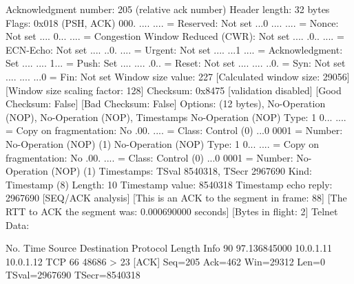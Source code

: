     Acknowledgment number: 205    (relative ack number)
    Header length: 32 bytes
    Flags: 0x018 (PSH, ACK)
        000. .... .... = Reserved: Not set
        ...0 .... .... = Nonce: Not set
        .... 0... .... = Congestion Window Reduced (CWR): Not set
        .... .0.. .... = ECN-Echo: Not set
        .... ..0. .... = Urgent: Not set
        .... ...1 .... = Acknowledgment: Set
        .... .... 1... = Push: Set
        .... .... .0.. = Reset: Not set
        .... .... ..0. = Syn: Not set
        .... .... ...0 = Fin: Not set
    Window size value: 227
    [Calculated window size: 29056]
    [Window size scaling factor: 128]
    Checksum: 0x8475 [validation disabled]
        [Good Checksum: False]
        [Bad Checksum: False]
    Options: (12 bytes), No-Operation (NOP), No-Operation (NOP), Timestamps
        No-Operation (NOP)
            Type: 1
                0... .... = Copy on fragmentation: No
                .00. .... = Class: Control (0)
                ...0 0001 = Number: No-Operation (NOP) (1)
        No-Operation (NOP)
            Type: 1
                0... .... = Copy on fragmentation: No
                .00. .... = Class: Control (0)
                ...0 0001 = Number: No-Operation (NOP) (1)
        Timestamps: TSval 8540318, TSecr 2967690
            Kind: Timestamp (8)
            Length: 10
            Timestamp value: 8540318
            Timestamp echo reply: 2967690
    [SEQ/ACK analysis]
        [This is an ACK to the segment in frame: 88]
        [The RTT to ACK the segment was: 0.000690000 seconds]
        [Bytes in flight: 2]
Telnet
    Data: 

No.     Time           Source                Destination           Protocol Length Info
     90 97.136845000   10.0.1.11             10.0.1.12             TCP      66     48686 > 23 [ACK] Seq=205 Ack=462 Win=29312 Len=0 TSval=2967690 TSecr=8540318

